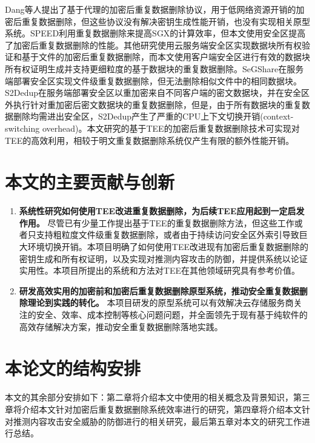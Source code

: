Dang等人\cite{dang2017Privacy}提出了基于代理的加密后重复数据删除协议，用于低网络资源开销的加密后重复数据删除，但这些协议没有解决密钥生成性能开销，也没有实现相关原型系统。SPEED\cite{cui2019SPEED}利用重复数据删除来提高SGX的计算效率，但本文使用安全区提高了加密后重复数据删除的性能。其他研究使用云服务端安全区实现数据块所有权验证\cite{you2020Proofs}和基于文件的加密后重复数据删除\cite{fuhry2020segshare}，而本文使用客户端安全区进行有效的数据块所有权证明生成并支持更细粒度的基于数据块的重复数据删除。SeGShare\cite{fuhry2020segshare}在服务端部署安全区实现文件级重复数据删除，但无法删除相似文件中的相同数据块。S2Dedup\cite{miranda2021S2Dedup}在服务端部署安全区以重加密来自不同客户端的密文数据块，并在安全区外执行针对重加密后密文数据块的重复数据删除，但是，由于所有数据块的重复数据删除均需进出安全区，S2Dedup产生了严重的CPU上下文切换开销(context-switching overhead)\cite{weisse2017regaining}。本文研究的基于TEE的加密后重复数据删除技术可实现对TEE的高效利用，相较于明文重复数据删除系统仅产生有限的额外性能开销。

\section{本文的主要贡献与创新}

\begin{enumerate}[leftmargin=*]
    \item \textbf{系统性研究如何使用TEE改进重复数据删除，为后续TEE应用起到一定启发作用。}
          尽管已有少量工作提出基于TEE的重复数据删除方法，但这些工作或者只支持粗粒度文件级重复数据删除\cite{fuhry2020segshare}，或者由于持续访问安全区外索引导致巨大环境切换开销\cite{miranda2021S2Dedup}。本项目明确了如何使用TEE改进现有加密后重复数据删除的密钥生成和所有权证明，以及实现对推测内容攻击的防御，并提供系统以论证实用性。本项目所提出的系统和方法对TEE在其他领域研究具有参考价值。
    \item \textbf{研发高效实用的加密前和加密后重复数据删除原型系统，推动安全重复数据删除理论到实践的转化。}
          本项目研发的原型系统可以有效解决云存储服务商关注的安全、效率、成本控制等核心问题问题，并全面领先于现有基于纯软件的高效存储解决方案，推动安全重复数据删除落地实践。
\end{enumerate}

\section{本论文的结构安排}

本文的其余部分安排如下：第二章将介绍本文中使用的相关概念及背景知识，第三章将介绍本文针对加密后重复数据删除系统效率进行的研究，第四章将介绍本文针对推测内容攻击安全威胁的防御进行的相关研究，最后第五章对本文的研究工作进行总结。